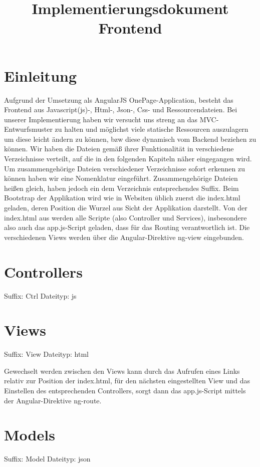 \title{Implementierungsdokument Frontend}

\chapter{Einleitung}

Aufgrund der Umsetzung als AngularJS OnePage-Application, besteht das Frontend aus Javascript(js)-, Html-, Json-, Css- und Ressourcendateien. Bei unserer Implementierung haben wir versucht uns streng an das MVC-Entwurfsmuster zu halten und möglichst viele statische Ressourcen auszulagern um diese leicht ändern zu können, bzw diese dynamisch vom Backend beziehen zu können. Wir haben die Dateien gemäß ihrer Funktionalität in verschiedene Verzeichnisse verteilt, auf die in den folgenden Kapiteln näher eingegangen wird. Um zusammengehörige Dateien verschiedener Verzeichnisse sofort erkennen zu können haben wir eine Nomenklatur eingeführt. Zusammengehörige Dateien heißen gleich, haben jedoch ein dem Verzeichnis entsprechendes Suffix. Beim Bootstrap der Applikation wird wie in Websiten üblich zuerst die index.html geladen, deren Position die Wurzel aus Sicht der
Applikation darstellt. Von der index.html aus werden alle Scripte (also Controller und Services),
insbesondere also auch das app.js-Script geladen, dass für das Routing verantwortlich ist.
Die verschiedenen Views werden über die Angular-Direktive ng-view eingebunden. 

\chapter{Controllers}

Suffix: Ctrl
Dateityp: js

\chapter{Views}

Suffix: View
Dateityp: html

Gewechselt werden zwischen den Views kann durch das Aufrufen eines Links relativ zur Position der index.html, für den nächsten eingestellten View und das Einstellen des entsprechenden Controllers, sorgt dann das app.js-Script mittels der Angular-Direktive ng-route. 

\chapter{Models}

Suffix: Model
Dateityp: json

